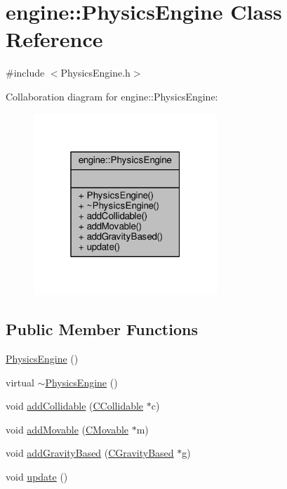 \hypertarget{classengine_1_1PhysicsEngine}{\section{engine\-:\-:Physics\-Engine Class Reference}
\label{classengine_1_1PhysicsEngine}
}


{\ttfamily \#include $<$Physics\-Engine.\-h$>$}



Collaboration diagram for engine\-:\-:Physics\-Engine\-:\nopagebreak
\begin{figure}[H]
\begin{center}
\leavevmode
\includegraphics[width=196pt]{classengine_1_1PhysicsEngine__coll__graph}
\end{center}
\end{figure}
\subsection*{Public Member Functions}
\begin{DoxyCompactItemize}
\item 
\hyperlink{classengine_1_1PhysicsEngine_a14c98b9b2eae12bff267b99df27ac9fc}{Physics\-Engine} ()
\item 
virtual \hyperlink{classengine_1_1PhysicsEngine_a7b708ba5517fdd9cc95c977dde7ff4ab}{$\sim$\-Physics\-Engine} ()
\item 
void \hyperlink{classengine_1_1PhysicsEngine_a609b1b5b818d7865c9b20abfe07e26e8}{add\-Collidable} (\hyperlink{classengine_1_1CCollidable}{C\-Collidable} $\ast$c)
\item 
void \hyperlink{classengine_1_1PhysicsEngine_a32690f48a5df0b98c5f326c0b11414ba}{add\-Movable} (\hyperlink{classengine_1_1CMovable}{C\-Movable} $\ast$m)
\item 
void \hyperlink{classengine_1_1PhysicsEngine_a9bad0bea60bde295662e6768ac08e2a9}{add\-Gravity\-Based} (\hyperlink{classengine_1_1CGravityBased}{C\-Gravity\-Based} $\ast$g)
\item 
void \hyperlink{classengine_1_1PhysicsEngine_a468ef9599ccd80e7e5c170d741ab1d21}{update} ()
\end{DoxyCompactItemize}


